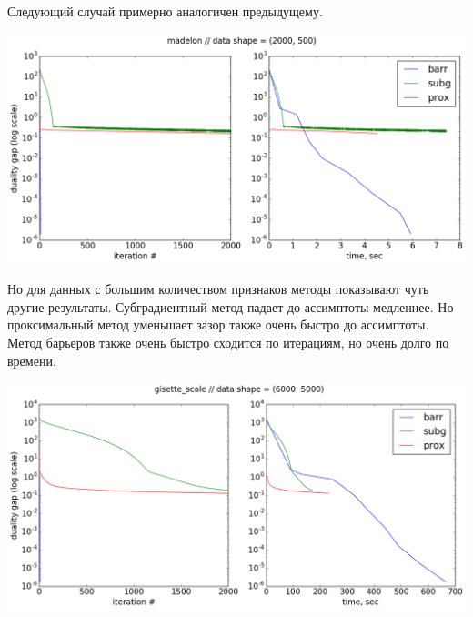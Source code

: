 \documentclass[12pt, a4paper]{article}
\begin{document}
    Следующий случай примерно аналогичен предыдущему.
    \begin{center}\includegraphics[width=\picwidth]{madelon.png}\end{center}

    Но для данных с большим количеством признаков методы показывают чуть другие результаты. Субградиентный метод падает до ассимптоты медленнее.
    Но проксимальный метод уменьшает зазор также очень быстро до ассимптоты. Метод барьеров также очень быстро сходится по итерациям, но очень долго по времени.
    \begin{center}\includegraphics[width=\picwidth]{gisette_scale.png}\end{center}
\end{document}
